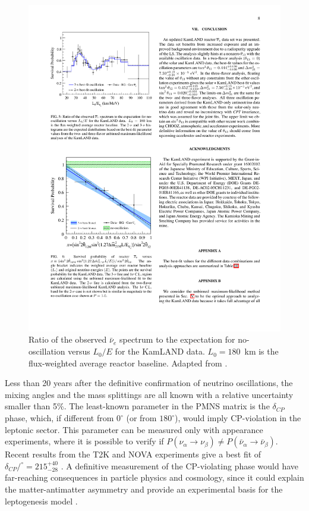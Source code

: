 \begin{figure}[htbp]
    \centering
    \includegraphics[width=0.75\linewidth]{figures/kamland.pdf}
    \caption{Ratio of the observed $\bar{\nu}_{e}$ spectrum to the expectation for no-oscillation versus $L_{0}/E$ for the KamLAND data. $L_{0} = 180$~km is the flux-weighted average reactor baseline. Adapted from \cite{Gando:2010aa}.}
    \label{fig:kamland}
\end{figure}

Less than 20 years after the definitive confirmation of neutrino oscillations, the mixing angles and the mass splittings are all known with a relative uncertainty smaller than 5\%. The least-known parameter in the PMNS matrix is the $\delta_{CP}$ phase, which, if different from $0^{\circ}$ (or from $180^{\circ}$), would imply CP-violation in the leptonic sector. This parameter can be measured only with appearance experiments, where it is possible to verify if
$P(\nu_{\alpha}\rightarrow\nu_{\beta}) \neq P(\bar{\nu}_{\alpha}\rightarrow\bar{\nu}_{\beta})$. Recent results from the T2K and NOVA experiments give a best fit of $\delta_{CP}/^{\circ}=215^{+40}_{-28}$ \cite{Esteban:2018azc}. A definitive measurement of the CP-violating phase would have far-reaching consequences in particle physics and cosmology, since it could explain the matter-antimatter asymmetry and provide an experimental basis for the leptogenesis model \cite{Fukugita:1986hr}.

